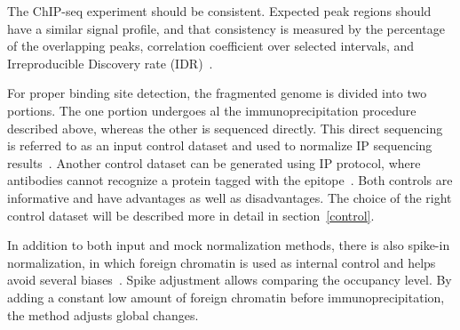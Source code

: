 The ChIP-seq experiment should be consistent. 
Expected peak regions should have a similar signal profile, and that consistency is measured by the percentage of the overlapping peaks, correlation coefficient over selected intervals, and Irreproducible Discovery rate (IDR)~\cite{shin2013computational}.

For proper binding site detection, the fragmented genome is divided into two portions. 
The one portion undergoes al the immunoprecipitation procedure described above, whereas the other is sequenced directly. 
This direct sequencing is referred to as an input control dataset and used to normalize IP sequencing results~\cite{kidder2011chip}. 
Another control dataset can be generated using IP protocol, where antibodies cannot recognize a protein tagged with the epitope~\cite{flensburg2014comparison}. 
Both controls are informative and have advantages as well as disadvantages.
The choice of the right control dataset will be described more in detail in section~\ref{control}.

In addition to both input and mock normalization methods, there is also spike-in normalization, in which foreign chromatin is used as internal control and helps avoid several biases~\cite{bonhoure2014quantifying}.
Spike adjustment allows comparing the occupancy level. 
By adding a constant low amount of foreign chromatin before immunoprecipitation, the method adjusts global changes. 